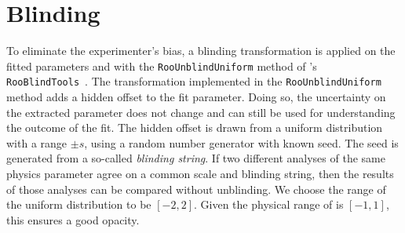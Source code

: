 
\section{Blinding}
\label{sec:dataanalysis:blinding}

To eliminate the experimenter's bias, a blinding transformation is applied on
the fitted \CP parameters \SDD and \CDD with the
\verb|RooUnblindUniform| method of \roofit's \verb|RooBlindTools|~\cite{roofit}.
The transformation implemented in the \verb|RooUnblindUniform| method adds a
hidden offset to the fit parameter. Doing so, the uncertainty on the extracted
parameter does not change and can still be used for understanding the outcome of
the fit. The hidden offset is drawn from a uniform distribution with a range
$\pm s$, using a random number generator with known seed. The seed is generated
from a so-called \emph{blinding string}. If two different analyses of the same
physics parameter agree on a common scale and blinding string, then the results
of those analyses can be compared without unblinding. We choose the range of the
uniform distribution to be $[-2,2]$. Given the physical range of \sintwobeta is
$[-1,1]$, this ensures a good opacity.
